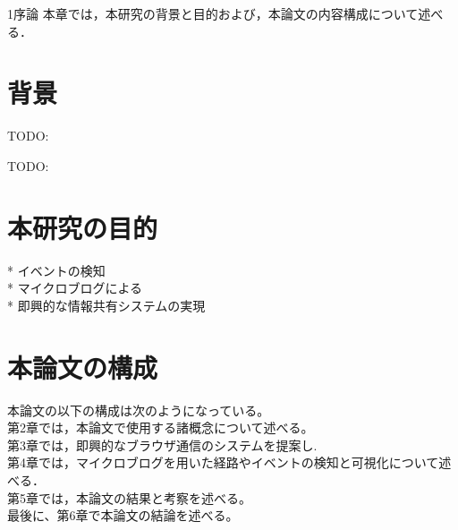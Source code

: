 \chapterhead
{1}{序論}
{本章では，本研究の背景と目的および，本論文の内容構成について述べる．}

\section{背景}
TODO:

\newpage

TODO:
\section{本研究の目的}
* イベントの検知 \\
* マイクロブログによる \\
* 即興的な情報共有システムの実現

\newpage

\section{本論文の構成}
本論文の以下の構成は次のようになっている。\\
第2章では，本論文で使用する諸概念について述べる。\\
第3章では，即興的なブラウザ通信のシステムを提案し. \\
第4章では，マイクロブログを用いた経路やイベントの検知と可視化について述べる．\\
第5章では，本論文の結果と考察を述べる。\\
最後に、第6章で本論文の結論を述べる。\\
